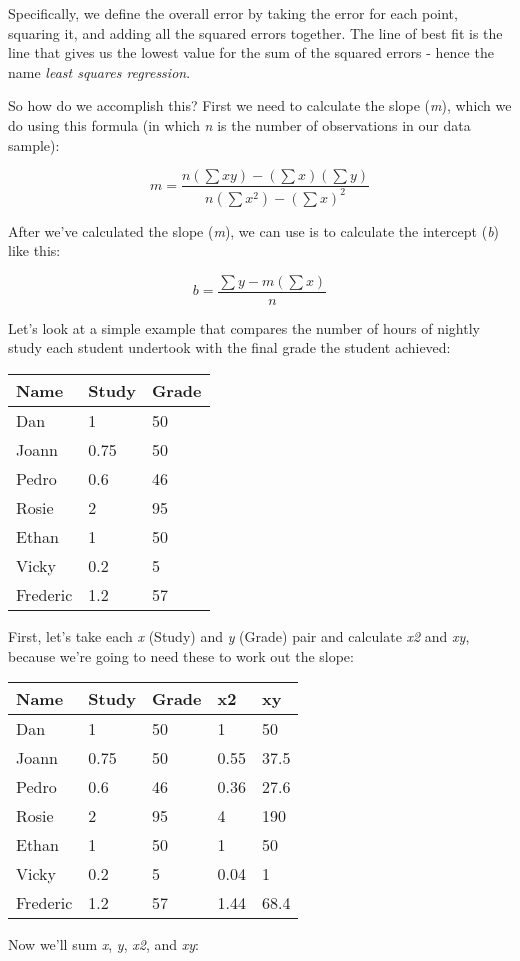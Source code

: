 \documentclass[11pt]{article}
\begin{document}
Specifically, we define the overall error by taking the error for each
point, squaring it, and adding all the squared errors together. The line
of best fit is the line that gives us the lowest value for the sum of
the squared errors - hence the name \emph{least squares regression}.

So how do we accomplish this? First we need to calculate the slope
(\emph{m}), which we do using this formula (in which \emph{n} is the
number of observations in our data sample):

\begin{equation}m = \frac{n(\sum{xy}) - (\sum{x})(\sum{y})}{n(\sum{x^{2}})-(\sum{x})^{2}}\end{equation}

After we've calculated the slope (\emph{m}), we can use is to calculate
the intercept (\emph{b}) like this:

\begin{equation}b = \frac{\sum{y} - m(\sum{x})}{n}\end{equation}

Let's look at a simple example that compares the number of hours of
nightly study each student undertook with the final grade the student
achieved:

\begin{longtable}[c]{@{}lll@{}}
\toprule
Name & Study & Grade\tabularnewline
\midrule
\endhead
Dan & 1 & 50\tabularnewline
Joann & 0.75 & 50\tabularnewline
Pedro & 0.6 & 46\tabularnewline
Rosie & 2 & 95\tabularnewline
Ethan & 1 & 50\tabularnewline
Vicky & 0.2 & 5\tabularnewline
Frederic & 1.2 & 57\tabularnewline
\bottomrule
\end{longtable}

First, let's take each \emph{x} (Study) and \emph{y} (Grade) pair and
calculate \emph{x2} and \emph{xy}, because we're going to need these to
work out the slope:

\begin{longtable}[c]{@{}lllll@{}}
\toprule
Name & Study & Grade & x2 & xy\tabularnewline
\midrule
\endhead
Dan & 1 & 50 & 1 & 50\tabularnewline
Joann & 0.75 & 50 & 0.55 & 37.5\tabularnewline
Pedro & 0.6 & 46 & 0.36 & 27.6\tabularnewline
Rosie & 2 & 95 & 4 & 190\tabularnewline
Ethan & 1 & 50 & 1 & 50\tabularnewline
Vicky & 0.2 & 5 & 0.04 & 1\tabularnewline
Frederic & 1.2 & 57 & 1.44 & 68.4\tabularnewline
\bottomrule
\end{longtable}

Now we'll sum \emph{x}, \emph{y}, \emph{x2}, and \emph{xy}:
\end{document}
